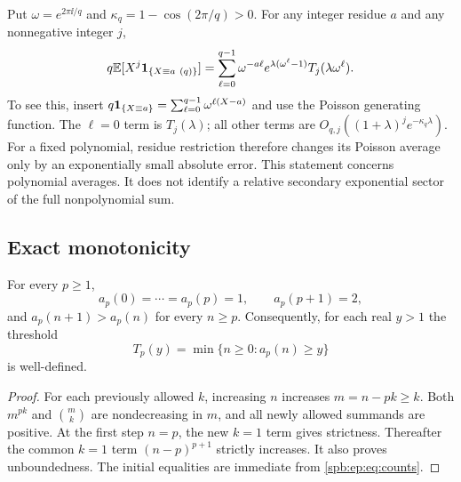 Put $\omega=e^{2\pi\ii/q}$ and
$\kappa_q=1-\cos(2\pi/q)>0$.
For any integer residue $a$ and any nonnegative integer $j$,
\begin{equation}\label{spb:ep:eq:filter}
 q\mathbb E[X^j\mathbf 1_{\{X\equiv a\ (q)\}}]
  =\sum_{\ell=0}^{q-1}\omega^{-a\ell}
       e^{\lambda(\omega^\ell-1)}T_j(\lambda\omega^\ell).
\end{equation}
To see this, insert
$q\mathbf 1_{\{X\equiv a\}}=\sum_{\ell=0}^{q-1}\omega^{\ell(X-a)}$
and use the Poisson generating function. The $\ell=0$ term is $T_j(\lambda)$;
all other terms are
$O_{q,j}((1+\lambda)^j e^{-\kappa_q\lambda})$.
For a fixed polynomial, residue restriction therefore changes its Poisson
average only by an exponentially small absolute error.
This statement concerns polynomial averages. It does not identify a
relative secondary exponential sector of the full nonpolynomial sum.

\subsection{Exact monotonicity}
\begin{proposition}\label{spb:ep:prop:monotone}
For every $p\ge1$,
\[
 a_p(0)=\cdots=a_p(p)=1,\qquad a_p(p+1)=2,
\]
and $a_p(n+1)>a_p(n)$ for every $n\ge p$.
Consequently, for each real $y>1$ the threshold
\begin{equation}\label{spb:ep:eq:threshold}
 T_p(y)=\min\{n\ge0:a_p(n)\ge y\}
\end{equation}
is well-defined.
\end{proposition}
\begin{proof}
For each previously allowed $k$, increasing $n$ increases
$m=n-pk\ge k$. Both $m^{pk}$ and $\binom mk$ are nondecreasing in $m$,
and all newly allowed summands are positive. At the first step $n=p$,
the new $k=1$ term gives strictness. Thereafter the common $k=1$ term
$(n-p)^{p+1}$ strictly increases. It also proves unboundedness.
The initial equalities are immediate from \eqref{spb:ep:eq:counts}.
\end{proof}

